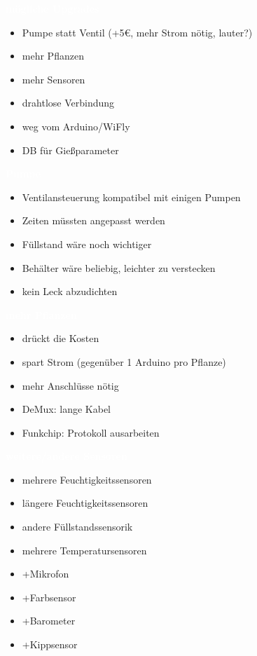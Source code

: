 \documentclass[bigger]{beamer}
\newcommand{\topic}[1]{{\huge{\textcolor{white}{\textbf{#1}}}}}
\begin{document}
\begin{frame}{\topic{mögliche Upgrades}}
	\begin{itemize}
		\item Pumpe statt Ventil (+{5\euro}, mehr Strom nötig, lauter?)
		\item mehr Pflanzen
		\item mehr Sensoren
		\item drahtlose Verbindung
		\item weg vom Arduino/WiFly
		\item DB für Gießparameter
	\end{itemize}
\end{frame}

\begin{frame}{\topic{Pumpe}}
	\begin{itemize}
		\item Ventilansteuerung kompatibel mit einigen Pumpen
		\item Zeiten müssten angepasst werden
		\item Füllstand wäre noch wichtiger
		\item Behälter wäre beliebig, leichter zu verstecken
		\item kein Leck abzudichten
	\end{itemize}
\end{frame}

\begin{frame}{\topic{mehr Pflanzen}}
	\begin{itemize}
		\item drückt die Kosten
		\item spart Strom (gegenüber 1 Arduino pro Pflanze)
		\item mehr Anschlüsse nötig
		\item DeMux: lange Kabel
		\item Funkchip: Protokoll ausarbeiten
	\end{itemize}
\end{frame}

\begin{frame}{\topic{weitere/andere Sensoren}}
	\begin{itemize}
		\item mehrere Feuchtigkeitssensoren
		\item längere Feuchtigkeitssensoren
		\item andere Füllstandssensorik
		\item mehrere Temperatursensoren
		\item +Mikrofon
		\item +Farbsensor
		\item +Barometer
		\item +Kippsensor
	\end{itemize}
\end{frame}
\end{document}

